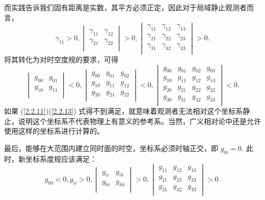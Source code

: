 \documentclass[UTF8, 12pt, a4paper, oneside, onecolumn, fontset=none]{ctexart}
\begin{document}
而实践告诉我们固有距离是实数，其平方必须正定，因此对于局域静止观测者而言，
\begin{equation}
\gamma_{11}>0,\begin{vmatrix}
\gamma_{11} & \gamma_{12}\\
\gamma_{21} & \gamma_{22}\\
\end{vmatrix}>0,\begin{vmatrix}
\gamma_{11} & \gamma_{12} & \gamma_{13}\\
\gamma_{21} & \gamma_{22} & \gamma_{23}\\
\gamma_{31} & \gamma_{32} & \gamma_{33}\\
\end{vmatrix}>0.
\end{equation}
将其转化为对时空度规的要求，可得
\begin{equation}
\begin{vmatrix}
g_{00} & g_{01}\\
g_{10} & g_{11}\\
\end{vmatrix}<0,
\begin{vmatrix}
g_{00} & g_{01} & g_{02}\\
g_{10} & g_{11} & g_{12}\\
g_{20} & g_{21} & g_{22}\\
\end{vmatrix}<0,
\begin{vmatrix}
g_{00} & g_{01} & g_{02} & g_{03}\\
g_{10} & g_{11} & g_{12} & g_{13}\\
g_{20} & g_{21} & g_{22} & g_{23}\\
g_{30} & g_{31} & g_{32} & g_{33}\\
\end{vmatrix}<0.\label{2.2.13}
\end{equation}
如果 (\ref{2.2.11})(\ref{2.2.13}) 式得不到满足，就意味着观测者无法相对这个坐标系静止，说明这个坐标系不代表物理上有意义的参考系。当然，广义相对论中还是允许使用这样的坐标系进行计算的。

最后，能够在大范围内建立同时面的时空，坐标系必须时轴正交，即 $g_{0i}=0$. 此时，新坐标系度规应该满足：
\begin{equation}
g_{00}<0, g_{ii}>0,
\begin{vmatrix}
g_{ii} & g_{ik}\\
g_{ki} & g_{kk}\\
\end{vmatrix}>0,
\begin{vmatrix}
g_{11} & g_{12} & g_{13}\\
g_{21} & g_{22} & g_{23}\\
g_{31} & g_{32} & g_{33}\\
\end{vmatrix}>0.
\end{equation}
\end{document}
